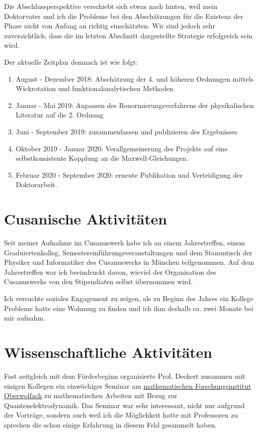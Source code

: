 \documentclass[a4paper,12pt]{article}
\begin{document}
Die Abschlussperspektive verschiebt sich etwas nach hinten, weil mein Doktorvater und ich die Probleme bei den
Abschätzungen für die Existenz der Phase nicht von Anfang an richtig einschätzten. Wir sind jedoch sehr zuversichtlich,
dass die im letzten Abschnitt dargestellte Strategie erfolgreich sein wird. 

Der aktuelle Zeitplan demnach ist wie folgt:

\begin{enumerate}
\item August - Dezember 2018: Abschätzung der 4. und höheren Ordnungen mittels Wickrotation und funktionalanalytischen Methoden
\item Januar - Mai 2019: Anpassen des Renormierungsverfahrens der physikalischen Literatur auf die 2. Ordnung
\item Juni - September 2019: zusammenfassen und publizieren des Ergebnisses
\item Oktober 2019 - Januar 2020:  Verallgemeinerung des Projekts auf eine selbstkonsistente Kopplung an die Maxwell-Gleichungen.
\item Februar 2020 - September 2020: erneute Publikation und Verteidigung der Doktorarbeit.
\end{enumerate}





\section{Cusanische Aktivitäten}

Seit meiner Aufnahme im Cusanuswerk habe ich an einem Jahrestreffen, einem Graduiertenkolleg, Semestereinführungsveranstaltungen und dem Stammtisch der Physiker und Informatiker des Cusanuswerks in München teilgenommen. Auf dem Jahrestreffen war ich beeindruckt davon, wieviel der Organisation des Cusanuswerks von den Stipendiaten selbst übernommen wird. 

Ich versuchte soziales Engagement zu zeigen, als zu Beginn des Jahres ein Kollege Probleme hatte eine Wohnung zu finden und ich ihm deshalb ca. zwei Monate bei mir aufnahm. 

\section{Wissenschaftliche Aktivitäten}

Fast zeitgleich mit dem Förderbeginn organisierte Prof. Deckert zusammen mit einigen Kollegen ein einwöchiges Seminar am  \href{https://www.mfo.de/}{mathematischen Forschungsinstitut Oberwolfach} zu mathematischen Arbeiten mit Bezug zur Quantenelektrodynamik. Das Seminar war sehr interessant, nicht nur aufgrund der Vorträge, sondern auch weil ich die Möglichkeit hatte mit Professoren zu sprechen die schon einige Erfahrung in diesem Feld gesammelt haben.
\end{document}
